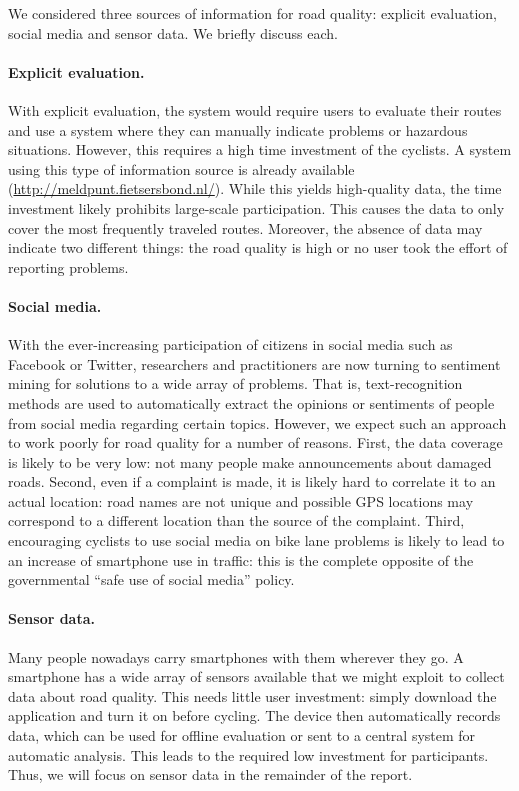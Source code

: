 \documentclass[a4paper,11pt]{article}
\begin{document}
We considered three sources of information for road quality: 
explicit evaluation, social media and sensor data. We briefly discuss each.

\paragraph{Explicit evaluation.}
With explicit evaluation, the system would require users to evaluate 
their routes and use a system where they can manually indicate 
problems or hazardous situations. However, this requires a high time 
investment of the cyclists. A system using this type of information source is already 
available (\url{http://meldpunt.fietsersbond.nl/}). While this yields high-quality data, 
the time investment likely prohibits large-scale participation. 
This causes the data to only cover the most frequently traveled routes. 
Moreover, the absence of data may indicate two different things: 
the road quality is high or no user took the effort of reporting problems.

\paragraph{Social media.}
With the ever-increasing participation of citizens in social media 
such as Facebook or Twitter, researchers and practitioners are 
now turning to sentiment mining for solutions to a wide array of problems. 
That is, text-recognition methods are used to automatically extract the 
opinions or sentiments of people from social media regarding certain topics. 
However, we expect such an approach to work poorly for road quality for a number of reasons. 
First, the data coverage is likely to be very low: not many people make announcements about 
damaged roads. Second, even if a complaint is made, it is likely hard to correlate it 
to an actual location: road names are not unique and possible GPS locations may correspond 
to a different location than the source of the complaint. Third, 
encouraging cyclists to use social media on bike lane problems 
is likely to lead to an increase of smartphone use in traffic: 
this is the complete opposite of the governmental ``safe use of social media'' policy.

\paragraph{Sensor data.}
Many people nowadays carry smartphones with them wherever they go. 
A smartphone has a wide array of sensors available that we might exploit 
to collect data about road quality. This needs little user investment: 
simply download the application and turn it on before cycling. 
The device then automatically records data, which can be used for 
offline evaluation or sent to a central system for automatic analysis. 
This leads to the required low investment for participants. Thus, 
we will focus on sensor data in the remainder of the report.
\end{document}
